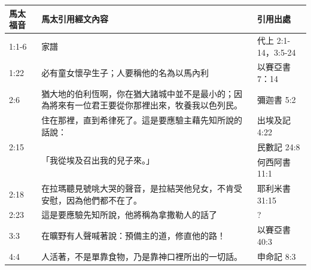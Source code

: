 \begin{table}[htbp]
  \centering 
    \begin{tabular}{|p{4.2em}|p{31.645em}|p{7.3em}|}
    \toprule
    \rowcolor[rgb]{ .749,  .749,  .749} \textcolor[rgb]{ .267,  .447,  .769}{\textbf{馬太福音}} 
    & \textcolor[rgb]{ .267,  .447,  .769}{\textbf{馬太引用經文內容}} 
    & \textcolor[rgb]{ .267,  .447,  .769}{\textbf{引用出處}} \\    
    \midrule        
    1:1-6 & 家譜    & 代上 2:1-14，3:5-24 \\
    \midrule
    1:22  & 必有童女懷孕生子；人要稱他的名為以馬內利 & 以賽亞書7：14 \\
    \midrule
    2:6   & 猶大地的伯利恆啊，你在猶大諸城中並不是最小的；因為將來有一位君王要從你那裡出來，牧養我以色列民。 & 彌迦書 5:2 \\
    \midrule
    \multirow{3}[6]{*}{2:15} & 住在那裡，直到希律死了。這是要應驗主藉先知所說的話說： & 出埃及記 4:22 \\
\cmidrule{3-3}    \multicolumn{1}{|l|}{} & \multirow{2}[4]{*}{「我從埃及召出我的兒子來。」} & 民數記 24:8 \\
\cmidrule{3-3}    \multicolumn{1}{|l|}{} & \multicolumn{1}{l|}{} & 何西阿書 11:1 \\
    \midrule
    2:18  & 在拉瑪聽見號咷大哭的聲音，是拉結哭他兒女，不肯受安慰，因為他們都不在了。 & 耶利米書 31:15 \\
    \midrule
    2:23  & 這是要應驗先知所說，他將稱為拿撒勒人的話了 & ? \\
    \midrule
    3:3   & 在曠野有人聲喊著說：預備主的道，修直他的路！ & 以賽亞書 40:3 \\
    \midrule
    4:4   & 人活著，不是單靠食物，乃是靠神口裡所出的一切話。 & 申命記 8:3 \\

\end{tabular}
\end{table}
